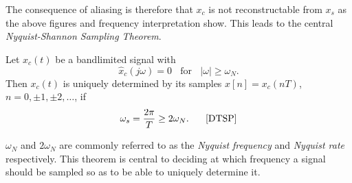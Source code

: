  The consequence of aliasing is therefore that $x_c$ is not reconstructable from $x_s$ as the above figures and frequency interpretation show. This leads to the central \textit{Nyquist-Shannon Sampling Theorem}.
\begin{theorem}
Let $x_c(t)$ be a bandlimited signal with
\begin{equation}
\hat{x}_c(j\omega)=0\phantom{m}\text{for}\phantom{m}|\omega|\geq \omega_N.
\end{equation}
Then $x_c(t)$ is uniquely determined by its samples $x[n]=x_c(nT)$, $n=0,\pm 1,\pm 2,\ldots$, if
\begin{equation}
\omega_s=\frac{2\pi}{T}\geq 2\omega_N.\phantom{mm}\text{\cite{DTSP}}
\end{equation}
\end{theorem}
$\omega_N$ and $2\omega_N$ are commonly referred to as the \textit{Nyquist frequency} and \textit{Nyquist rate} respectively. This theorem is central to deciding at which frequency a signal should be sampled so as to be able to uniquely determine it.


